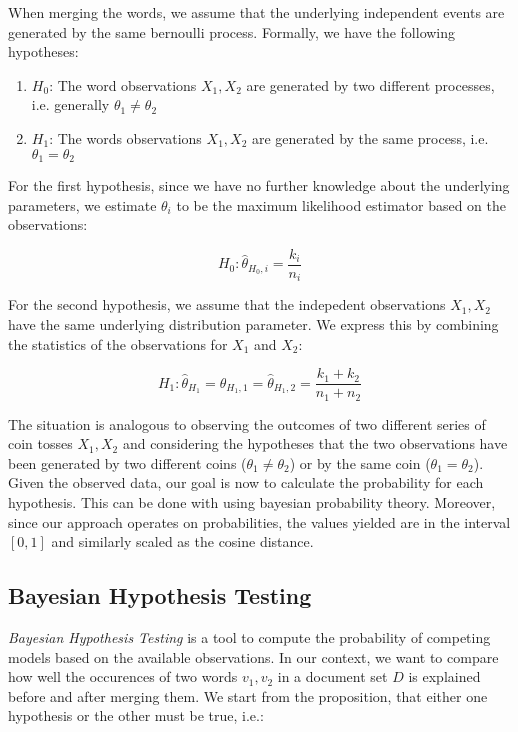 When merging the words, we assume that the underlying independent events are
generated by the same bernoulli process. Formally, we have the following hypotheses: 

\begin{enumerate}
  \item $H_0$: The word observations $X_1, X_2$ are generated by two different
  processes, i.e.  generally $\theta_1 \neq \theta_2$
  \item $H_1$: The words observations $X_1, X_2$ are generated by the same
  process, i.e. $\theta_1 = \theta_2$
\end{enumerate}

For the first hypothesis, since we have no further knowledge about the
underlying parameters, we estimate $\theta_i$ to be the maximum likelihood 
estimator based on the observations: 

\begin{equation*}
	H_0: \hat{\theta}_{H_0,i} = \frac{k_i}{n_i}
\end{equation*}

For the second hypothesis, we assume that the indepedent observations $X_1, X_2$
have the same underlying distribution parameter. We express this by combining
the statistics of the observations for $X_1$ and $X_2$:

\begin{equation*}
H_1: \hat{\theta}_{H_1} =\hat{\theta}_{H_1,1} =
\hat{\theta}_{H_1,2} =
\frac{k_1 + k_2}{n_1 + n_2}
\end{equation*}
 
The situation is analogous to observing the outcomes of two different series of
coin tosses $X_1, X_2$ and considering the hypotheses that the two
observations have been generated by two different coins ($\theta_1 \neq \theta_2$) or by the same coin
($\theta_1 = \theta_2$). Given the observed data, our goal is now to calculate
the probability for each hypothesis. This can be done with using bayesian probability theory.
Moreover, since our approach operates on probabilities, the values yielded are
in the interval $[0, 1]$ and similarly scaled as the cosine distance. 

\subsection{Bayesian Hypothesis Testing}

\emph{Bayesian Hypothesis Testing} is a tool to compute the probability of
competing models based on the available observations. In our context, we want to
compare how well the occurences of two words $v_1, v_2$ in a document set $D$ is
explained before and after merging them.
We start from the proposition, that either one hypothesis or the other must be true, i.e.:

